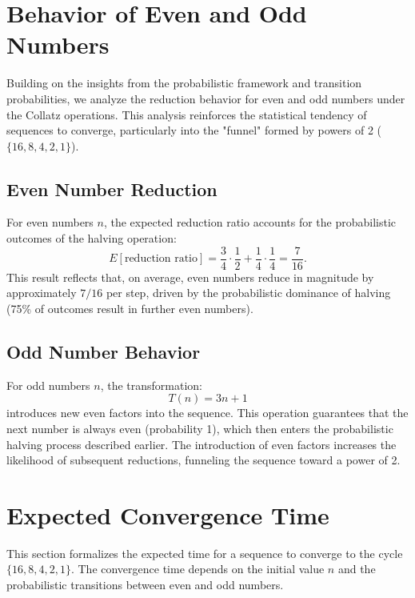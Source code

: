 
\section{Behavior of Even and Odd Numbers}
Building on the insights from the probabilistic framework and transition probabilities, we analyze the reduction behavior for even and odd numbers under the Collatz operations. This analysis reinforces the statistical tendency of sequences to converge, particularly into the "funnel" formed by powers of 2 (\( \{16, 8, 4, 2, 1\} \)).


\subsection{Even Number Reduction}
For even numbers \( n \), the expected reduction ratio accounts for the probabilistic outcomes of the halving operation:
\[
E[\text{reduction ratio}] = \frac{3}{4} \cdot \frac{1}{2} + \frac{1}{4} \cdot \frac{1}{4} = \frac{7}{16}.
\]
This result reflects that, on average, even numbers reduce in magnitude by approximately \( 7/16 \) per step, driven by the probabilistic dominance of halving (75\% of outcomes result in further even numbers).

\subsection{Odd Number Behavior}
For odd numbers \( n \), the transformation:
\[
T(n) = 3n + 1
\]
introduces new even factors into the sequence. This operation guarantees that the next number is always even (probability 1), which then enters the probabilistic halving process described earlier. The introduction of even factors increases the likelihood of subsequent reductions, funneling the sequence toward a power of 2.

\section{Expected Convergence Time}
This section formalizes the expected time for a sequence to converge to the cycle \( \{16, 8, 4, 2, 1\} \). The convergence time depends on the initial value \( n \) and the probabilistic transitions between even and odd numbers.

